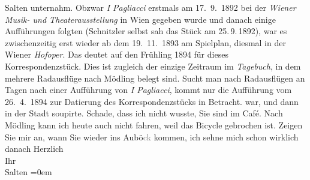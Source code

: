 \begin{ledgroupsized}[t]{13cm}
{{{                   Salten unternahm. Obzwar 
                  \emph{I Pagliacci} erstmals am 17. 9. 1892 bei der \emph{Wiener Musik- und
                        Theaterausstellung} in Wien
                  gegeben wurde und danach einige Aufführungen folgten (Schnitzler selbst sah das Stück am 25. 9. 1892), war es zwischenzeitig erst wieder ab dem 19. 11. 1893
                  am Spielplan, diesmal in der Wiener 
                  \emph{Hofoper}. Das deutet auf den Frühling 1894 für dieses Korrespondenzstück.
                  Dies ist zugleich der einzige Zeitraum im \emph{Tagebuch}, 
                  in dem mehrere Radausflüge nach Mödling belegt sind.
                  Sucht man nach Radausflügen an Tagen nach einer Aufführung von \emph{I Pagliacci}, kommt 
                  nur die Aufführung vom 26. 4. 1894 zur Datierung des
                  Korrespondenzstücks in Betracht.}}}\label{K_L03120-1h} war, und dann in der Stadt soupirte. Schade, dass ich nicht wusste, Sie sind im Café.
               Nach Mödling kann ich heute auch nicht {\pb}fahren, weil das Bicycle gebrochen ist. Zeigen Sie mir an, wann Sie wieder ins Aubö\textcolor{gray}{ck} kommen, ich sehne mich schon wirklich danach\pend
           \pstart
           Herzlich {\\[\baselineskip]}Ihr {\\[\baselineskip]}\spacefill\mbox{Salten}\pend
           \leftskip=0em{}
         
         \endnumbering{}\end{ledgroupsized}  \newcommand{\dateiname}{L03120}\newcommand{\titel}{Felix Salten an Arthur Schnitzler, [27. 4. 1894?]}\newcommand{\editorInnen}{Martin Anton Müller und Laura Untner}
      
